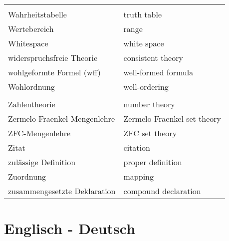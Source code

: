 \begin{longtabu}   { @{} X[l] X[l] }
     & \\
    Wahrheitstabelle & truth table \\
    Wertebereich & range \\
    Whitespace & white space \\
    widerspruchsfreie Theorie & consistent theory \\
    wohlgeformte Formel (wff) & well-formed formula \\
    Wohlordnung & well-ordering \\
     & \\
    Zahlentheorie & number theory \\
    Zermelo-Fraenkel-{\allowbreak}Mengenlehre & Zermelo-Fraenkel set theory \\
    ZFC-Mengenlehre & ZFC set theory \\
    Zitat & citation \\
    zulässige Definition & proper definition \\
    Zuordnung & mapping \\
    zusammengesetzte Deklaration & compound declaration \\ 
  \end{longtabu}
  \pagebreak


\section{Englisch - Deutsch}

